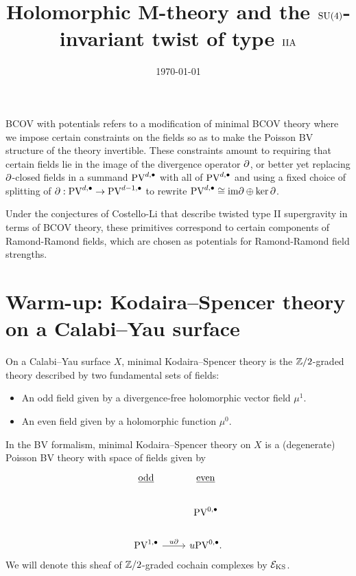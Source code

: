 \documentclass[11pt]{article}
\date{\today}
\title{Holomorphic M-theory and the $\text{SU}(4)$-invariant twist of type $\text{IIA}$ }
\newcommand\bu{\bullet}
\begin{document}
\maketitle

BCOV with potentials refers to a modification of minimal BCOV theory where we impose certain constraints on the fields so as to make the Poisson BV structure of the theory invertible. These constraints amount to requiring that certain fields lie in the image of the divergence operator \(\partial\), or better yet replacing $\partial$-closed fields in a summand \(\text{PV}^{d,\bullet}\) with all of \(\text{PV}^{d,\bullet}\) and using a fixed choice of splitting of \(\partial: \text{PV}^{d,\bullet}\to \text{PV}^{d-1,\bullet}\) to rewrite \(\text{PV}^{d,\bullet}\cong\text{im}\partial\oplus\ker\partial\).

Under the conjectures of Costello-Li that describe twisted type II supergravity in terms of BCOV theory, these primitives correspond to certain components of Ramond-Ramond fields, which are chosen as potentials for Ramond-Ramond field strengths.

\section{Warm-up: Kodaira--Spencer theory on a Calabi--Yau surface}

On a Calabi--Yau surface $X$, minimal Kodaira--Spencer theory is the $\mathbb{Z}/2$-graded theory described by two fundamental sets of fields:
\begin{itemize}
\item An odd field given by a divergence-free holomorphic vector field $\mu^1$. 
\item An even field given by a holomorphic function $\mu^0$.
\end{itemize}


In the BV formalism, minimal Kodaira--Spencer theory on $X$ is a (degenerate) Poisson BV theory with space of fields given by
\[
\begin{tikzcd}
\ul{\rm odd} & \ul{\rm even} \\
 & \PV^{0,\bu} \\
 \PV^{1,\bu} \ar[r, "u \partial"] & u \PV^{0,\bu} .
\end{tikzcd}
\]
We will denote this sheaf of $\mathbb{Z}/2$-graded cochain complexes by $\mathcal{E}_{\rm KS}$.
\end{document}
